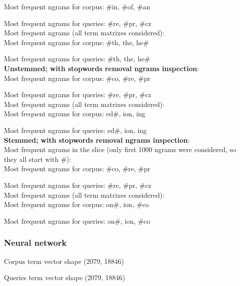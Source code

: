 Most frequent ngrams for corpus: \#in, \#of, \#an

Most frequent ngrams for queries: \#re, \#pr, \#cz \\

Most frequent ngrams (all term matrixes considered): \\

Most frequent ngrams for corpus: \#th, the, he\#

Most frequent ngrams for queries: \#th, the, he\# \\

\textbf{Unstemmed; with stopwords removal ngrams inspection}:\\

Most frequent ngrams for corpus: \#co, \#re, \#pr

Most frequent ngrams for queries: \#re, \#pr, \#cz \\

Most frequent ngrams (all term matrixes considered): \\

Most frequent ngrams for corpus: ed\#, ion, ing

Most frequent ngrams for queries: ed\#, ion, ing \\

\textbf{Stemmed; with stopwords removal ngrams inspection}:\\

Most frequent ngrams in the slice (only first 1000 ngrams were considered, so
they all start with \#):\\

Most frequent ngrams for corpus: \#co, \#re, \#pr

Most frequent ngrams for queries: \#re, \#pr, \#cz \\

Most frequent ngrams (all term matrixes considered): \\

Most frequent ngrams for corpus: on\#, ion, \#co

Most frequent ngrams for queries: on\#, ion, \#co \\

\subsubsection{Neural network}

Corpus term vector shape (2079, 18846)

Queries term vector shape (2079, 18846)


